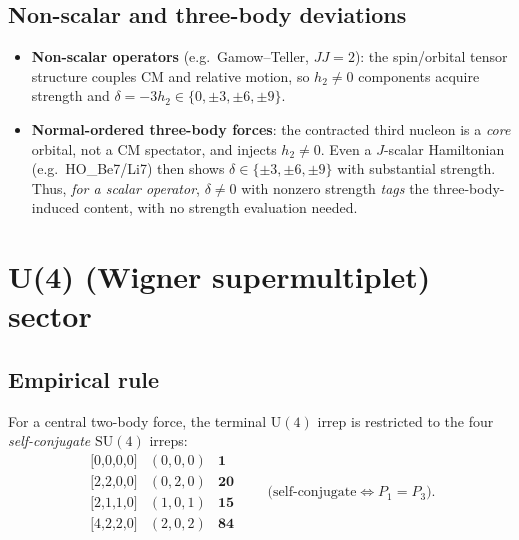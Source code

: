 \documentclass[11pt]{article}
\newcommand{\diff}{\ensuremath{\delta}}
\begin{document}
\subsection{Non-scalar and three-body deviations}
\begin{itemize}
\item \textbf{Non-scalar operators} (e.g.\ Gamow--Teller, $JJ=2$): the
spin/orbital tensor structure couples CM and relative motion, so $h_2\neq0$
components acquire strength and $\diff=-3h_2\in\{0,\pm3,\pm6,\pm9\}$.
\item \textbf{Normal-ordered three-body forces}: the contracted third nucleon
is a \emph{core} orbital, not a CM spectator, and injects $h_2\neq0$. Even a
$J$-scalar Hamiltonian (e.g.\ HO\_Be7/Li7) then shows
$\diff\in\{\pm3,\pm6,\pm9\}$ with substantial strength. Thus, \emph{for a scalar
operator}, $\diff\neq0$ with nonzero strength \emph{tags} the three-body-induced
content, with no strength evaluation needed.
\end{itemize}

\section{U(4) (Wigner supermultiplet) sector}

\subsection{Empirical rule}
For a central two-body force, the terminal $\mathrm{U}(4)$ irrep is restricted
to the four \emph{self-conjugate} $\mathrm{SU}(4)$ irreps:
\[
\begin{array}{llll}
\text{[0,0,0,0]} & (0,0,0) & \mathbf 1 \\
\text{[2,2,0,0]} & (0,2,0) & \mathbf{20} \\
\text{[2,1,1,0]} & (1,0,1) & \mathbf{15} \\
\text{[4,2,2,0]} & (2,0,2) & \mathbf{84}
\end{array}
\qquad\text{(self-conjugate}\iff P_1=P_3\text{).}
\]
\end{document}
